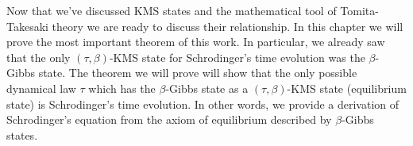 Now that we've discussed KMS states and the mathematical tool of Tomita-Takesaki theory we are ready to discuss their relationship. In this chapter we will prove the most important theorem of this work. In particular, we already saw that the only $(\tau,\beta)$-KMS state for Schrodinger's time evolution was the $\beta$-Gibbs state. The theorem we will prove will show that the only possible dynamical law $\tau$ which has the $\beta$-Gibbs state as a $(\tau,\beta)$-KMS state (equilibrium state) is Schrodinger's time evolution. In other words, we provide a derivation of Schrodinger's equation from the axiom of equilibrium described by $\beta$-Gibbs states.  